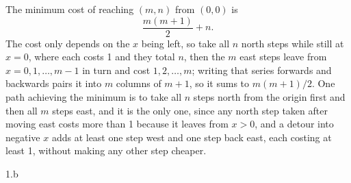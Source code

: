 \begin{answer}
  The minimum cost of reaching $(m,n)$ from $(0,0)$ is
  \[
    \frac{m(m+1)}{2} + n .
  \]
  The cost only depends on the $x$ being left, so take all $n$ north steps while still at $x = 0$,
  where each costs 1 and they total $n$, then the $m$ east steps leave from $x = 0, 1, \dots, m-1$
  in turn and cost $1, 2, \dots, m$; writing that series forwards and backwards pairs it into $m$
  columns of $m+1$, so it sums to $m(m+1)/2$. One path achieving the minimum is to take all $n$
  steps north from the origin first and then all $m$ steps east, and it is the only one, since any
  north step taken after moving east costs more than 1 because it leaves from $x > 0$, and a detour
  into negative $x$ adds at least one step west and one step back east, each costing at least 1,
  without making any other step cheaper.
\end{answer}
\clearpage

\LARGE
1.b
\normalsize

